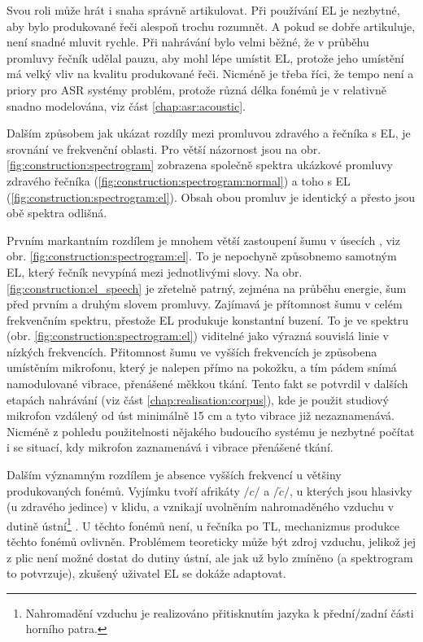 Svou roli může hrát i snaha správně artikulovat. Při používání EL je nezbytné, aby bylo produkované řeči alespoň trochu rozumnět. A pokud se dobře artikuluje, není snadné mluvit rychle. Při nahrávání bylo velmi běžné, že v průběhu promluvy řečník udělal pauzu, aby mohl lépe umístit EL, protože jeho umístění má velký vliv na kvalitu produkované řeči. Nicméně je třeba říci, že tempo není a priory pro ASR systémy problém, protože různá délka fonémů je v relativně snadno modelována, viz část \ref{chap:asr:acoustic}.

Dalším způsobem jak ukázat rozdíly mezi promluvou zdravého a řečníka s EL, je srovnání ve frekvenční oblasti. Pro větší názornost jsou na obr. \ref{fig:construction:spectrogram} zobrazena společně spektra ukázkové promluvy zdravého řečníka (\ref{fig:construction:spectrogram:normal}) a toho s EL (\ref{fig:construction:spectrogram:el}). Obsah obou promluv je identický a přesto jsou obě spektra odlišná.

Prvním markantním rozdílem je mnohem větší zastoupení šumu v úsecích , viz obr. \ref{fig:construction:spectrogram:el}. To je nepochyně způsobnemo samotným EL, který řečník nevypíná mezi jednotlivými slovy. Na obr. \ref{fig:construction:el_speech} je zřetelně patrný, zejména na průběhu energie, šum před prvním a druhým slovem promluvy. Zajímavá je přítomnost šumu v celém frekvenčním spektru, přestože EL produkuje konstantní buzení. To je ve spektru (obr. \ref{fig:construction:spectrogram:el}) viditelné jako výrazná souvislá linie v nízkých frekvencích. Přitomnost šumu ve vyšších frekvencích je způsobena umístěním mikrofonu, který je nalepen přímo na pokožku, a tím pádem snímá namodulované vibrace, přenášené měkkou tkání. Tento fakt se potvrdil v dalších etapách nahrávání (viz část \ref{chap:realisation:corpus}), kde je použit studiový mikrofon vzdálený od úst minimálně 15 cm a tyto vibrace již nezaznamenává. Nicméně z pohledu použitelnosti nějakého budoucího systému je nezbytné počítat i se situací, kdy mikrofon zaznamenává i vibrace přenášené tkání.

Dalším významným rozdílem je absence vyšších frekvencí u většiny produkovaných fonémů. Vyjímku tvoří afrikáty $/c/$ a $/\check{c}/$, u kterých jsou hlasivky (u zdravého jedince) v klidu, a vznikají uvolněním nahromaděného vzduchu v dutině ústní\footnote{Nahromadění vzduchu je realizováno přitisknutím jazyka k přední/zadní části horního patra.} \cite{Psutka2006}. U těchto fonémů není, u  řečníka po TL, mechanizmus produkce těchto fonémů ovlivněn. Problémem teoreticky může být zdroj vzduchu, jelikož jej z plic není možné dostat do dutiny ústní, ale jak už bylo zmíněno (a spektrogram to potvrzuje), zkušený uživatel EL se dokáže adaptovat.

